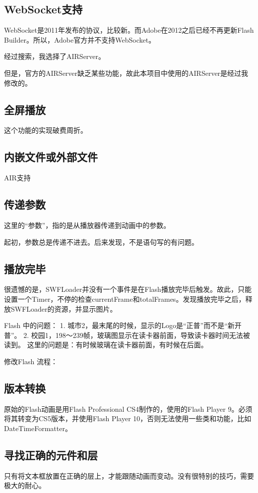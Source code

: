 \subsection{WebSocket支持}
WebSocket是2011年发布的协议，比较新。而Adobe在2012之后已经不再更新Flash Builder。所以，Adobe官方并不支持WebSocket。

经过搜索，我选择了AIRServer。

但是，官方的AIRServer缺乏某些功能，故此本项目中使用的AIRServer是经过我修改的。

\subsection{全屏播放}
这个功能的实现破费周折。

\subsection{内嵌文件或外部文件}
AIR支持

\subsection{传递参数}
这里的“参数”，指的是从播放器传递到动画中的参数。

起初，参数总是传递不进去。后来发现，不是语句写的有问题。


\subsection{播放完毕}
很遗憾的是，SWFLoader并没有一个事件是在Flash播放完毕后触发。故此，只能设置一个Timer，不停的检查currentFrame和totalFrames。发现播放完毕之后，释放SWFLoader的资源，并显示图片。





Flash 中的问题：
1. 城市2，最末尾的时候，显示的Logo是“正普”而不是“新开普”。
2. 校园1，198～239帧，玻璃图显示在读卡器前面，导致读卡器时间无法被读到。
这里的问题是：有时候玻璃在读卡器前面，有时候在后面。


修改Flash 流程：

\subsection{版本转换}
原始的Flash动画是用Flash Professional CS4制作的，使用的Flash Player 9。必须将其转变为CS5版本，并使用Flash Player 10，否则无法使用一些类和功能，比如DateTimeFormatter。

\subsection{寻找正确的元件和层}
只有将文本框放置在正确的层上，才能跟随动画而变动。没有很特别的技巧，需要极大的耐心。

